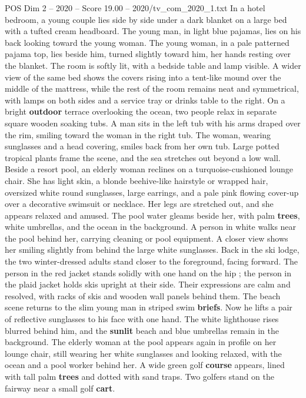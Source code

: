 \begin{textsample}{POS Dim 2 – 2020 – Score 19.00 – 2020/tv\_com\_2020\_1.txt}
In a hotel bedroom, a young couple lies side by side under a dark blanket on a large bed with a tufted cream headboard.
The young man, in light blue pajamas, lies on his back looking toward the young woman.
The young woman, in a pale patterned pajama top, lies beside him, turned slightly toward him, her hands resting over the blanket.
The room is softly lit, with a bedside table and lamp visible.
A wider view of the same bed shows the covers rising into a tent-like mound over the middle of the mattress, while the rest of the room remains neat and symmetrical, with lamps on both sides and a service tray or drinks table to the right.
On a bright \textbf{outdoor} terrace overlooking the ocean, two people relax in separate square wooden soaking tubs.
A man sits in the left tub with his arms draped over the rim, smiling toward the woman in the right tub.
The woman, wearing sunglasses and a head covering, smiles back from her own tub.
Large potted tropical plants frame the scene, and the sea stretches out beyond a low wall.
Beside a resort pool, an elderly woman reclines on a turquoise-cushioned lounge chair.
She has light skin, a blonde beehive-like hairstyle or wrapped hair, oversized white round sunglasses, large earrings, and a pale pink flowing cover-up over a decorative swimsuit or necklace.
Her legs are stretched out, and she appears relaxed and amused.
The pool water gleams beside her, with palm \textbf{trees}, white umbrellas, and the ocean in the background.
A person in white walks near the pool behind her, carrying cleaning or pool equipment.
A closer view shows her smiling slightly from behind the large white sunglasses.
Back in the ski lodge, the two winter-dressed adults stand closer to the foreground, facing forward.
The person in the red jacket stands solidly with one hand on the hip ; the person in the plaid jacket holds skis upright at their side.
Their expressions are calm and resolved, with racks of skis and wooden wall panels behind them.
The beach scene returns to the slim young man in striped swim \textbf{briefs}.
Now he lifts a pair of reflective sunglasses to his face with one hand.
The white lighthouse rises blurred behind him, and the \textbf{sunlit} beach and blue umbrellas remain in the background.
The elderly woman at the pool appears again in profile on her lounge chair, still wearing her white sunglasses and looking relaxed, with the ocean and a pool worker behind her.
A wide green golf \textbf{course} appears, lined with tall palm \textbf{trees} and dotted with sand traps.
Two golfers stand on the fairway near a small golf \textbf{cart}.

\end{textsample}

